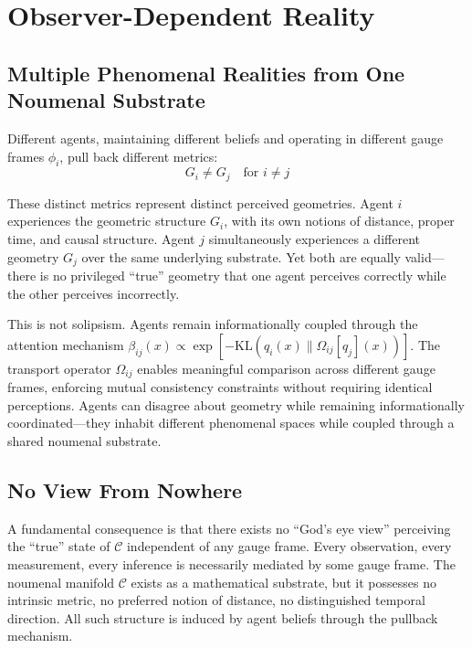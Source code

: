 \documentclass[11pt]{article}
\begin{document}
\section{Observer-Dependent Reality}
\label{sec:observer}

\subsection{Multiple Phenomenal Realities from One Noumenal Substrate}

Different agents, maintaining different beliefs and operating in different gauge frames $\phi_i$, pull back different metrics:
\begin{equation}
G_i \neq G_j \quad \text{for } i \neq j
\end{equation}

These distinct metrics represent distinct perceived geometries. Agent $i$ experiences the geometric structure $G_i$, with its own notions of distance, proper time, and causal structure. Agent $j$ simultaneously experiences a different geometry $G_j$ over the same underlying substrate. Yet both are equally valid---there is no privileged ``true'' geometry that one agent perceives correctly while the other perceives incorrectly.

This is not solipsism. Agents remain informationally coupled through the attention mechanism $\beta_{ij}(x) \propto \exp[-\mathrm{KL}(q_i(x) \| \Omega_{ij}[q_j](x))]$. The transport operator $\Omega_{ij}$ enables meaningful comparison across different gauge frames, enforcing mutual consistency constraints without requiring identical perceptions. Agents can disagree about geometry while remaining informationally coordinated---they inhabit different phenomenal spaces while coupled through a shared noumenal substrate.

\subsection{No View From Nowhere}

A fundamental consequence is that there exists no ``God's eye view'' perceiving the ``true'' state of $\mathcal{C}$ independent of any gauge frame. Every observation, every measurement, every inference is necessarily mediated by some gauge frame. The noumenal manifold $\mathcal{C}$ exists as a mathematical substrate, but it possesses no intrinsic metric, no preferred notion of distance, no distinguished temporal direction. All such structure is induced by agent beliefs through the pullback mechanism.
\end{document}
